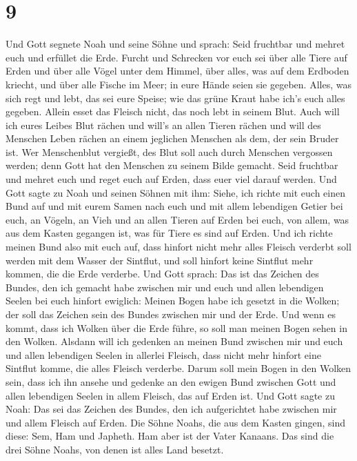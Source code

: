 \hypertarget{section-8}{%
\section{9}\label{section-8}}

 Und Gott segnete Noah und seine Söhne und sprach: Seid
fruchtbar und mehret euch und erfüllet die Erde.  Furcht
und Schrecken vor euch sei über alle Tiere auf Erden und über alle Vögel
unter dem Himmel, über alles, was auf dem Erdboden kriecht, und über
alle Fische im Meer; in eure Hände seien sie gegeben. 
Alles, was sich regt und lebt, das sei eure Speise; wie das grüne Kraut
habe ich's euch alles gegeben.  Allein esset das Fleisch
nicht, das noch lebt in seinem Blut.  Auch will ich eures
Leibes Blut rächen und will's an allen Tieren rächen und will des
Menschen Leben rächen an einem jeglichen Menschen als dem, der sein
Bruder ist.  Wer Menschenblut vergießt, des Blut soll auch
durch Menschen vergossen werden; denn Gott hat den Menschen zu seinem
Bilde gemacht.  Seid fruchtbar und mehret euch und reget
euch auf Erden, dass euer viel darauf werden.  Und Gott
sagte zu Noah und seinen Söhnen mit ihm:  Siehe, ich
richte mit euch einen Bund auf und mit eurem Samen nach euch
 und mit allem lebendigen Getier bei euch, an Vögeln, an
Vieh und an allen Tieren auf Erden bei euch, von allem, was aus dem
Kasten gegangen ist, was für Tiere es sind auf Erden. 
Und ich richte meinen Bund also mit euch auf, dass hinfort nicht mehr
alles Fleisch verderbt soll werden mit dem Wasser der Sintflut, und soll
hinfort keine Sintflut mehr kommen, die die Erde verderbe.
 Und Gott sprach: Das ist das Zeichen des Bundes, den ich
gemacht habe zwischen mir und euch und allen lebendigen Seelen bei euch
hinfort ewiglich:  Meinen Bogen habe ich gesetzt in die
Wolken; der soll das Zeichen sein des Bundes zwischen mir und der Erde.
 Und wenn es kommt, dass ich Wolken über die Erde führe,
so soll man meinen Bogen sehen in den Wolken.  Alsdann
will ich gedenken an meinen Bund zwischen mir und euch und allen
lebendigen Seelen in allerlei Fleisch, dass nicht mehr hinfort eine
Sintflut komme, die alles Fleisch verderbe.  Darum soll
mein Bogen in den Wolken sein, dass ich ihn ansehe und gedenke an den
ewigen Bund zwischen Gott und allen lebendigen Seelen in allem Fleisch,
das auf Erden ist.  Und Gott sagte zu Noah: Das sei das
Zeichen des Bundes, den ich aufgerichtet habe zwischen mir und allem
Fleisch auf Erden.  Die Söhne Noahs, die aus dem Kasten
gingen, sind diese: Sem, Ham und Japheth. Ham aber ist der Vater
Kanaans.  Das sind die drei Söhne Noahs, von denen ist
alles Land besetzt.

